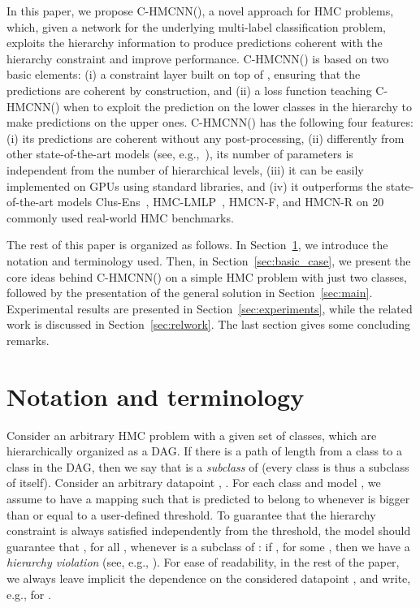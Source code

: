 \documentclass{article}
\newcommand{\system}[1]{C-HMCNN(#1)}
\newcommand{\lmlp}{{HMC-LMLP}}
\newcommand{\ens}{{Clus-Ens}}
\newcommand{\hmcnf}{{HMCN-F}}
\newcommand{\hmcnr}{{HMCN-R}}
\begin{document}
In this paper, we propose \system{}, a novel approach for HMC problems, which, given a network  for the underlying multi-label classification problem, exploits the hierarchy information to produce  predictions coherent with the hierarchy constraint and improve performance. 
\system{} is
based on two basic elements: 
(i) a constraint layer built on top of ,  ensuring that the predictions are coherent by construction,
 and (ii) a loss function teaching \system{}
 when to exploit the prediction on the lower classes in the hierarchy to make predictions on the upper ones.  
\system{} has the following four features: (i) its predictions are coherent without any post-processing, (ii) differently from other state-of-the-art models (see, e.g.,~\cite{cerri2018}), its number of parameters is independent from the number of hierarchical levels, (iii)  it can be easily implemented on GPUs using standard libraries, and (iv) it outperforms the state-of-the-art models {\ens}~\citep{schietgat2010}, {\lmlp}~\citep{cerri2016}, {\hmcnf}, and {\hmcnr} \citep{cerri2018} on 20 commonly used real-world HMC benchmarks.
 








The rest of this paper is organized as follows. 
In Section~\ref{sec:terminology}, we introduce the notation and terminology used. 
Then, in Section~\ref{sec:basic_case}, we present the core ideas behind \system{} on a simple HMC problem 
with just two classes, followed by the presentation of the general solution in Section~\ref{sec:main}. Experimental results are presented in Section~\ref{sec:experiments}, while the related work is discussed in Section~\ref{sec:relwork}. The last section gives some concluding remarks. 

\section{Notation and terminology}\label{sec:terminology}

Consider an arbitrary HMC problem with a given set of classes, which are hierarchically organized as a DAG. If there is a path of length  from a class  to a class  in the DAG, then we say that  is a {\sl subclass} of  (every class is thus a subclass of itself).  Consider an arbitrary datapoint , . 
For each class  and model , we assume to have a mapping  such that  is predicted to belong to  whenever 
 is bigger than or equal to a user-defined threshold. To guarantee that the hierarchy constraint is always satisfied independently from the threshold, the model  should guarantee that , for all  , whenever  is a subclass of : if , for some , then we have a {\sl hierarchy violation} (see, e.g., \citep{cerri2018}). 
For ease of readability,  
in the rest of the paper, we always leave implicit the dependence on the considered datapoint ,
and write, e.g.,  for .
\end{document}
